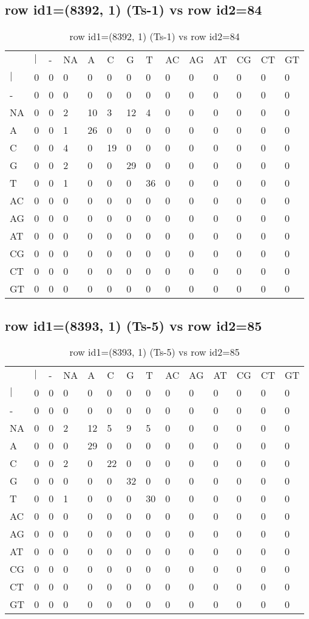 \subsection{row id1=(8392, 1) (Ts-1) vs row id2=84}
\begin{center}
\begin{longtable}{|l|l|l|l|l|l|l|l|l|l|l|l|l|l|}
\caption{row id1=(8392, 1) (Ts-1) vs row id2=84} \label{table_dm452}\\
\hline
\\
\hline
&$|$&-&NA&A&C&G&T&AC&AG&AT&CG&CT&GT\\
$|$&0&0&0&0&0&0&0&0&0&0&0&0&0\\
-&0&0&0&0&0&0&0&0&0&0&0&0&0\\
NA&0&0&2&10&3&12&4&0&0&0&0&0&0\\
A&0&0&1&26&0&0&0&0&0&0&0&0&0\\
C&0&0&4&0&19&0&0&0&0&0&0&0&0\\
G&0&0&2&0&0&29&0&0&0&0&0&0&0\\
T&0&0&1&0&0&0&36&0&0&0&0&0&0\\
AC&0&0&0&0&0&0&0&0&0&0&0&0&0\\
AG&0&0&0&0&0&0&0&0&0&0&0&0&0\\
AT&0&0&0&0&0&0&0&0&0&0&0&0&0\\
CG&0&0&0&0&0&0&0&0&0&0&0&0&0\\
CT&0&0&0&0&0&0&0&0&0&0&0&0&0\\
GT&0&0&0&0&0&0&0&0&0&0&0&0&0\\
\hline
\end{longtable}
\end{center}

\subsection{row id1=(8393, 1) (Ts-5) vs row id2=85}
\begin{center}
\begin{longtable}{|l|l|l|l|l|l|l|l|l|l|l|l|l|l|}
\caption{row id1=(8393, 1) (Ts-5) vs row id2=85} \label{table_dm454}\\
\hline
\\
\hline
&$|$&-&NA&A&C&G&T&AC&AG&AT&CG&CT&GT\\
$|$&0&0&0&0&0&0&0&0&0&0&0&0&0\\
-&0&0&0&0&0&0&0&0&0&0&0&0&0\\
NA&0&0&2&12&5&9&5&0&0&0&0&0&0\\
A&0&0&0&29&0&0&0&0&0&0&0&0&0\\
C&0&0&2&0&22&0&0&0&0&0&0&0&0\\
G&0&0&0&0&0&32&0&0&0&0&0&0&0\\
T&0&0&1&0&0&0&30&0&0&0&0&0&0\\
AC&0&0&0&0&0&0&0&0&0&0&0&0&0\\
AG&0&0&0&0&0&0&0&0&0&0&0&0&0\\
AT&0&0&0&0&0&0&0&0&0&0&0&0&0\\
CG&0&0&0&0&0&0&0&0&0&0&0&0&0\\
CT&0&0&0&0&0&0&0&0&0&0&0&0&0\\
GT&0&0&0&0&0&0&0&0&0&0&0&0&0\\
\hline
\end{longtable}
\end{center}

